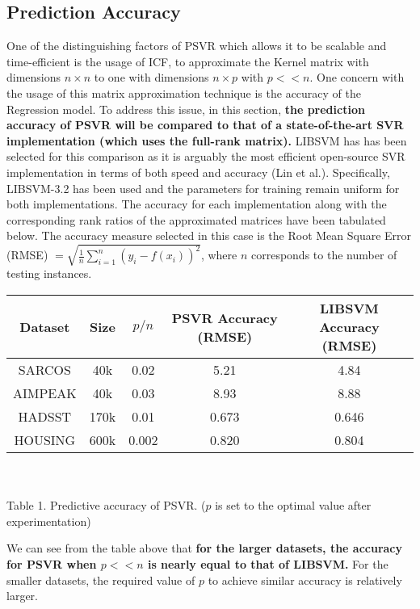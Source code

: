 \documentclass[12pt]{article}
\begin{document}
\subsection{Prediction Accuracy}
\label{Prediction Accuracy}
One of the distinguishing factors of PSVR which allows it to be scalable and time-efficient is the usage of ICF, to approximate the Kernel matrix with dimensions $n \times n$ to one with dimensions $n \times p$ with $p << n$. One concern with the usage of this matrix approximation technique is the accuracy of the Regression model. To address this issue, in this section, {\bf the prediction accuracy of PSVR will be compared to that of a state-of-the-art SVR implementation (which uses the full-rank matrix). }
\newline\newline
LIBSVM has has been selected for this comparison as it is arguably the most efficient open-source SVR implementation in terms of both speed and accuracy (Lin et al.). Specifically, LIBSVM-3.2 has been used and the parameters for training remain uniform for both implementations.
\newline
The accuracy for each implementation along with the corresponding rank ratios of the approximated matrices have been tabulated below. 
The accuracy measure selected in this case is the Root Mean Square Error (RMSE) $= \sqrt{\frac{1}{n} \sum_{i=1}^{n}{(y_{i} - f(x_{i}))^2}}$, where $n$ corresponds to the number of testing instances.
\begin{center}
\begin{tabular}{ |c|c|c|c|c| }
  \hline
  Dataset & Size & $p/n$ & PSVR Accuracy (RMSE) & LIBSVM Accuracy (RMSE) \\
  \hline
  SARCOS & 40k& 0.02& 5.21 & 4.84 \\
  AIMPEAK & 40k & 0.03 & 8.93 & 8.88 \\
  HADSST & 170k & 0.01 & 0.673 &0.646 \\
  HOUSING & 600k & 0.002 & 0.820 & 0.804 \\
  \hline
\end{tabular}
\ \\
\ \\
Table 1. Predictive accuracy of PSVR. ($p$ is set to the optimal value  after experimentation)
\end{center}
We can see from the table above that {\bf for the larger datasets, the accuracy for PSVR when $ p << n$ is nearly equal to that of LIBSVM.} For the smaller datasets, the required value of $p$ to achieve similar accuracy is relatively larger.
\end{document}
